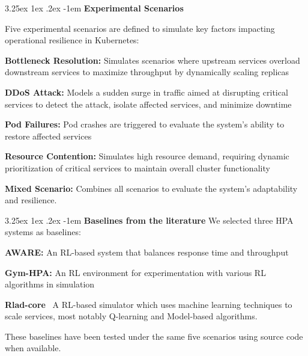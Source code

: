 \documentclass[conference]{IEEEtran}
\makeatletter
\renewcommand\paragraph{\@startsection{paragraph}{5}{\z@}%
  {3.25ex \@plus1ex \@minus.2ex}%
  {-1em}%
  {\normalfont\normalsize\bfseries}}
\makeatother
\begin{document}
\paragraph{\textbf{Experimental Scenarios}}

\noindent Five experimental scenarios are defined to simulate key factors impacting operational resilience in Kubernetes:
%
\begin{enumerate*}[label=\textbf{\arabic*)}, itemjoin={;\quad }]
    \item \textbf{Bottleneck Resolution:} Simulates scenarios where upstream services overload downstream services to maximize throughput by dynamically scaling replicas
    \item \textbf{DDoS Attack:} Models a sudden surge in traffic aimed at disrupting critical services to detect the attack, isolate affected services, and minimize downtime~\cite{Liu2018}
    \item \textbf{Pod Failures:} Pod crashes are triggered to evaluate the system's ability to restore affected services~\cite{burns2016borg}
    \item \textbf{Resource Contention:} Simulates high resource demand, requiring dynamic prioritization of critical services to maintain overall cluster functionality~\cite{Vhatkar2022}
    \item \textbf{Mixed Scenario:} Combines all scenarios to evaluate the system's adaptability and resilience.
\end{enumerate*}

\paragraph{\textbf{Baselines from the literature}}
%
\noindent We selected three HPA systems as baselines:
\begin{enumerate*}[label=\textbf{\arabic*)}, itemjoin={;\quad }]
    \item \textbf{AWARE:} An RL-based system that balances response time and throughput~\cite{aware2023}
    \item \textbf{Gym-HPA:} An RL environment for experimentation with various RL algorithms in simulation~\cite{gymhpa2022}
    \item \textbf{Rlad-core}~\cite{Rossi2019} A RL-based simulator which uses machine learning techniques to scale services, most notably Q-learning and Model-based algorithms.
\end{enumerate*}

These baselines have been tested under the same five scenarios using source code when available.
\end{document}

